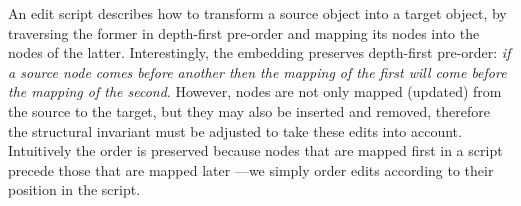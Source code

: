 \documentclass{sigplanconf}
\theoremstyle{plain}
\newtheorem{definition}{Definition}
\begin{document}
An edit script describes how to transform a source object into a
target object, by traversing the former in depth-first
  pre-order and mapping its nodes into the nodes of the latter.
%
Interestingly, the embedding preserves depth-first pre-order: \emph{if a
source node comes before another then the mapping of the first will
come before the mapping of the second}.
%
However, nodes are not only mapped (updated) from the source to the
target, but they may also be inserted and removed, therefore the
structural invariant must be adjusted to take these edits into
account.
%
Intuitively the order is preserved because nodes that are mapped first
in a script precede those that are mapped later ---we simply order
edits according to their position in the script.
\end{document}
